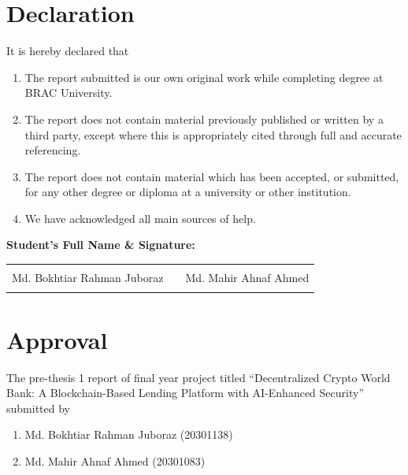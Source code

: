 \documentclass[12pt,a4paper]{report}
\begin{document}
\chapter*{Declaration}

It is hereby declared that

\begin{enumerate}
\item The report submitted is our own original work while completing degree at BRAC University.

\item The report does not contain material previously published or written by a third party, except where this is appropriately cited through full and accurate referencing.

\item The report does not contain material which has been accepted, or submitted, for any other degree or diploma at a university or other institution.

\item We have acknowledged all main sources of help.
\end{enumerate}

\vspace{2cm}

\textbf{Student's Full Name \& Signature:}

\vspace{2cm}

\begin{tabular}{p{6cm}p{1cm}p{6cm}}
\hrulefill & & \hrulefill \\
\centering Md. Bokhtiar Rahman Juboraz & & \centering Md. Mahir Ahnaf Ahmed \tabularnewline
\centering 20301138 & & \centering 20301083 \tabularnewline
\end{tabular}

\newpage
\thispagestyle{empty}

\chapter*{Approval}

The pre-thesis 1 report of final year project titled ``Decentralized Crypto World Bank: A Blockchain-Based Lending Platform with AI-Enhanced Security'' submitted by

\begin{enumerate}
\item Md. Bokhtiar Rahman Juboraz (20301138)
\item Md. Mahir Ahnaf Ahmed (20301083)
\end{enumerate}
\end{document}
